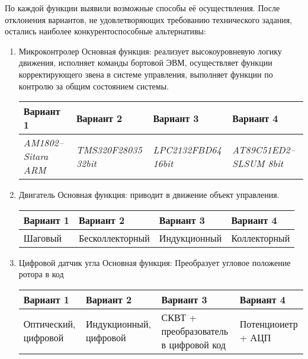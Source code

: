 По каждой функции выявили возможные способы её осуществления.
После отклонения вариантов, не удовлетворяющих требованию технического
задания, остались наиболее конкурентоспособные альтернативы:

\begin{enumerate}
    \item Микроконтролер
        Основная функция: реализует высокоуровневую логику движения,
        исполняет команды бортовой ЭВМ, осуществляет функции корректирующего
        звена в системе управления, выполняет функции по контролю за общим
        состоянием системы.

        \begin{tabular}{|p{3.5cm}|p{3.5cm}|p{3.5cm}|p{3.5cm}|}
            \hline
            Вариант 1 & Вариант 2 & Вариант 3 & Вариант 4 \\
            \hline
            \textit{AM1802--Sitara ARM} &
            \textit{TMS320F28035 32bit} &
            \textit{LPC2132FBD64 16bit} &
            \textit{AT89C51ED2--SLSUM 8bit} \\
            \hline
        \end{tabular}

    \item Двигатель
        Основная функция: приводит в движение объект управления.

        \begin{tabular}{|p{3.5cm}|p{3.5cm}|p{3.5cm}|p{3.5cm}|}
            \hline
            Вариант 1 & Вариант 2 & Вариант 3 & Вариант 4 \\
            \hline
            Шаговый &
            Бесколлекторный &
            Индукционный &
            Коллекторный \\
            \hline
        \end{tabular}

    \item Цифровой датчик угла
        Основная функция: Преобразует угловое положение ротора в код

        \begin{tabular}{|p{3.5cm}|p{3.5cm}|p{3.5cm}|p{3.5cm}|}
            \hline
            Вариант 1 & Вариант 2 & Вариант 3 & Вариант 4 \\
            \hline
            Оптический, цифровой &
            Индукционный, цифровой &
            СКВТ + преобразователь в цифровой код &
            Потенциоиетр + АЦП \\
            \hline
        \end{tabular}


\end{enumerate}
